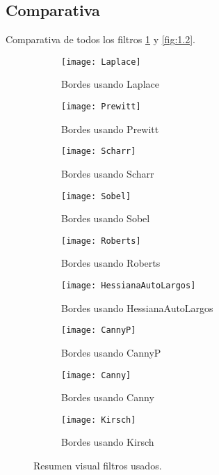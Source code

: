 \subsection{Comparativa}
Comparativa de todos los filtros \ref{fig:1.1} y \ref{fig:1.2}. 
\begin{figure}
	\begin{subfigure}[c]{.5\linewidth}
	\centering\large \texttt{[image: Laplace]}
	\caption{Bordes usando Laplace}
	\end{subfigure}%
	\begin{subfigure}[c]{.5\linewidth}
	\centering\large \texttt{[image: Prewitt]}
	\caption{Bordes usando Prewitt}
	\end{subfigure}%

	\begin{subfigure}[c]{.5\linewidth}
	\centering\large \texttt{[image: Scharr]}
	\caption{Bordes usando Scharr}
	\end{subfigure}%
	\begin{subfigure}[c]{.5\linewidth}
	\centering\large \texttt{[image: Sobel]}
	\caption{Bordes usando Sobel}
	\end{subfigure}%
	
	\begin{subfigure}[c]{.5\linewidth}
	\centering\large \texttt{[image: Roberts]}
	\caption{Bordes usando Roberts}
	\end{subfigure}%
	\begin{subfigure}[c]{.5\linewidth}
	\centering\large \texttt{[image: HessianaAutoLargos]}
	\caption{Bordes usando HessianaAutoLargos}
	\end{subfigure}%
	
	\begin{subfigure}[c]{.5\linewidth}
	\centering\large \texttt{[image: CannyP]}
	\caption{Bordes usando CannyP}
	\end{subfigure}%
	\begin{subfigure}[c]{.5\linewidth}
	\centering\large \texttt{[image: Canny]}
	\caption{Bordes usando Canny}
	\end{subfigure}%
	
	\begin{subfigure}[c]{.5\linewidth}
	\centering\large \texttt{[image: Kirsch]}
	\caption{Bordes usando Kirsch}
	\end{subfigure}	

\caption{Resumen visual filtros usados.}\label{fig:1.1}
\end{figure}


